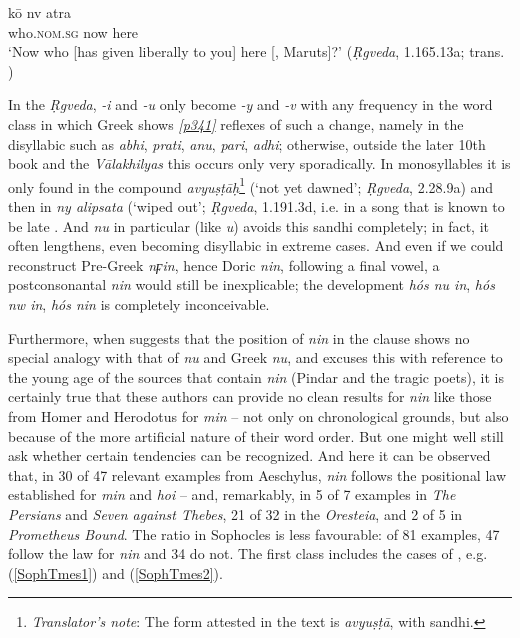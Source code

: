 \begin{exe}
\ex \gll kō nv atra \\
who.\textsc{nom.sg} now here \\
\trans `Now who [has given liberally to you] here {[}, Maruts{]}?' 
(\textit{\d{R}gveda}, 1.165.13a; trans. \citealt[1417]{JamisonBrereton2014})
\label{RV_ex3}
\end{exe}

In the \textit{\d{R}gveda}, \emph{-i} and \emph{-u} only become \emph{-y} and \emph{-v} with any frequency in the word class in which Greek shows \hyperlink{p341}{\emph{[p341]}} reflexes of such a change, namely in the disyllabic  such as \emph{abhi}, \emph{prati}, \emph{anu}, \emph{pari}, \emph{adhi}; otherwise, outside the later 10th book and the \emph{Vālakhilyas} this occurs only very sporadically. In monosyllables it is only found in the compound \emph{avyuṣṭāḥ}\footnote{\emph{Translator's note}: The form attested in the text is \emph{avyuṣṭā}, with sandhi.} (`not yet dawned'; \textit{\d{R}gveda}, 2.28.9a) and then in \emph{ny alipsata} (`wiped out'; \textit{\d{R}gveda}, 1.191.3d, i.e. in a song that is known to be late \citep[438, note 4]{Oldenberg1888}. And \emph{nu} in particular (like \emph{u}) avoids this sandhi completely; in fact, it often lengthens, even becoming disyllabic in extreme cases. And even if we could reconstruct Pre-Greek \emph{nϝin}, hence Doric \emph{nin}, following a final vowel, a postconsonantal \emph{nin} would still be inexplicable; the development \emph{hós nu in}, \emph{hós nw in}, \emph{hós nin} is completely inconceivable.

Furthermore, when \citet[646--647]{Thumb1887} suggests that the position of \emph{nin} in the clause shows no special analogy with that of  \emph{nu} and Greek \emph{nu}, and excuses this with reference to the young age of the sources that contain \emph{nin} (Pindar and the tragic poets), it is certainly true that these authors can provide no clean results for \emph{nin} like those from Homer and Herodotus for \emph{min} -- not only on chronological grounds, but also because of the more artificial nature of their word order. But one might well still ask whether certain tendencies can be recognized. And here it can be observed that, in 30 of 47 relevant examples from Aeschylus, \emph{nin} follows the positional law established for \emph{min} and \emph{hoi} -- and, remarkably, in 5 of 7 examples in \emph{The Persians} and \emph{Seven against Thebes}, 21 of 32 in the \emph{Oresteia}, and 2 of 5 in \emph{Prometheus Bound}. The ratio in Sophocles is less favourable: of 81 examples, 47 follow the law for \emph{nin} and 34 do not. The first class includes the cases of , e.g. (\ref{SophTmes1}) and (\ref{SophTmes2}).

